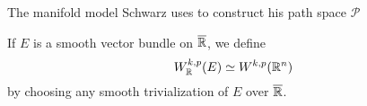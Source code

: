 \documentclass{amsart}
\begin{document}
\begin{clear}{The manifold model Schwarz uses to construct his path
    space $\mathscr{P}$}
\begin{defn}
  If $E$ is a smooth vector bundle on $\overline{\mathbb{R}}$, we define
  \begin{equation*}
    W^{k,p}_{\mathbb{R}}(E)\simeq W^{k,p}(\mathbb{R}^{n})
  \end{equation*}
  by choosing any smooth trivialization of $E$ over $\overline{\mathbb{R}}$.
\end{defn}
  



\end{clear}
\end{document}
